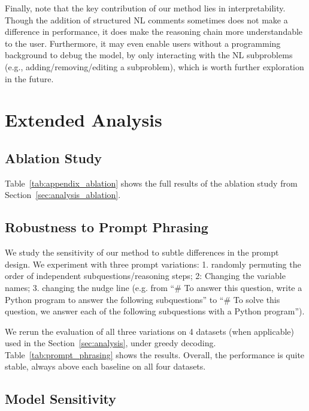 \documentclass[11pt]{article}
\begin{document}
Finally, note that the key contribution of our method lies in interpretability. Though the addition of structured NL comments sometimes does not make a difference in performance, it does make the reasoning chain more understandable to the user. Furthermore, it may even enable users without a programming background to debug the model, by only interacting with the NL subproblems (e.g., adding/removing/editing a subproblem), which is worth further exploration in the future.
 
\section{Extended Analysis}
\label{sec:appendix_extended_analysis}

\subsection{Ablation Study}

Table~\ref{tab:appendix_ablation} shows the full results of the ablation study from Section~\ref{sec:analysis_ablation}.




\subsection{Robustness to Prompt Phrasing}
\label{sec:appendix_robustness_to_prompt_phrasing}



We study the sensitivity of our method to subtle differences in the prompt design. We experiment with three prompt variations: 1. randomly permuting the order of independent subquestions/reasoning steps; 2: Changing the variable names; 3. changing the nudge line (e.g. from ``\# To answer this question, write a Python program to answer the following subquestions'' to ``\# To solve this question, we answer each of the following subquestions with a Python program'').

We rerun the evaluation of all three variations on 4 datasets (when applicable) used in the Section~\ref{sec:analysis}, under greedy decoding. Table~\ref{tab:prompt_phrasing} shows the results. Overall, the performance is quite stable, always above each baseline on all four datasets.


\subsection{Model Sensitivity}
\label{sec:analysis_LM_effect}
\end{document}
